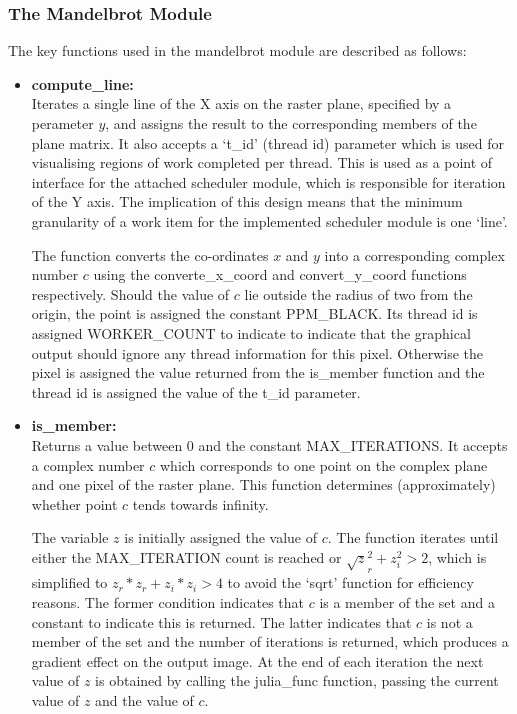 \subsubsection*{The Mandelbrot Module}

The key functions used in the mandelbrot module are described as follows:

\begin{itemize}
\item \textbf{compute\_line:} \\
            Iterates a single line of the X axis on the raster plane, specified by a perameter \(y\), and assigns the result to the corresponding
            members of the plane matrix.
            It also accepts a `t\_id' (thread id) parameter which is used for visualising regions of work completed per thread.
            This is used as a point of interface for the attached scheduler module, which is responsible for iteration of the Y axis. 
            The implication of this design means that the minimum granularity of a work item for the implemented scheduler module
            is one `line'.

            The function converts the co-ordinates \(x\) and \(y\) into a corresponding complex number \(c\) using the converte\_x\_coord and 
            convert\_y\_coord functions respectively. 
            Should the value of \(c\) lie outside the radius of two from the origin, the point is 
            assigned the constant PPM\_BLACK. Its thread id is assigned WORKER\_COUNT to indicate to indicate that the graphical output should
            ignore any thread information for this pixel.
            Otherwise the pixel is assigned the value returned from the is\_member function and the thread id is assigned the value of 
            the t\_id parameter.
            
\item \textbf{is\_member:} \\
            Returns a value between 0 and the constant MAX\_ITERATIONS. It accepts a complex number \(c\) which corresponds to one point 
            on the complex plane and one pixel of the raster plane. This function determines (approximately) whether point \(c\) tends towards
            infinity.
            
            The variable \(z\) is initially assigned the value of \(c\). The function iterates until either the MAX\_ITERATION count is reached
            or \(\sqrt z_r^2 + z_i^2 > 2\), which is simplified to \(z_r * z_r + z_i * z_i > 4\) to avoid the `sqrt' function for efficiency
            reasons. The former condition indicates that \(c\) is a member of the set and a constant to indicate this is returned. 
            The latter indicates that \(c\) is not a member of the set and the number of iterations is returned, which produces a gradient 
            effect on the output image. At the end of each iteration the next value of \(z\) is obtained by calling the julia\_func function,
            passing the current value of \(z\) and the value of \(c\).
            

\end{itemize}
